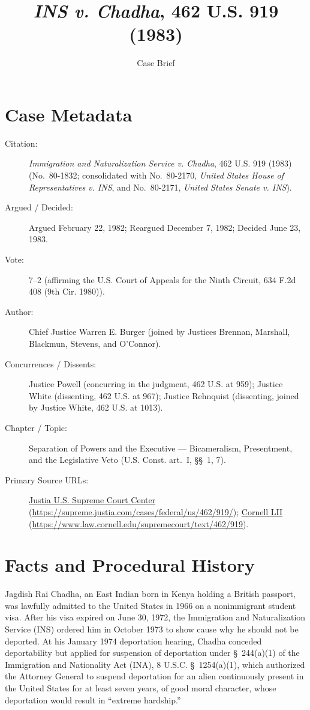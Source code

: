 \documentclass[12pt]{article}
\title{\textit{INS v. Chadha}, 462 U.S. 919 (1983)}
\author{Case Brief}
\date{}
\begin{document}
\maketitle

\section{Case Metadata}
\begin{description}
  \item[Citation:] \textit{Immigration and Naturalization Service v. Chadha}, 462 U.S. 919 (1983) (No.~80-1832; consolidated with No.~80-2170, \textit{United States House of Representatives v. INS}, and No.~80-2171, \textit{United States Senate v. INS}).
  \item[Argued / Decided:] Argued February 22, 1982; Reargued December 7, 1982; Decided June 23, 1983.
  \item[Vote:] 7--2 (affirming the U.S. Court of Appeals for the Ninth Circuit, 634 F.2d 408 (9th Cir. 1980)).
  \item[Author:] Chief Justice Warren E. Burger (joined by Justices Brennan, Marshall, Blackmun, Stevens, and O'Connor).
  \item[Concurrences / Dissents:] Justice Powell (concurring in the judgment, 462 U.S. at 959); Justice White (dissenting, 462 U.S. at 967); Justice Rehnquist (dissenting, joined by Justice White, 462 U.S. at 1013).
  \item[Chapter / Topic:] Separation of Powers and the Executive --- Bicameralism, Presentment, and the Legislative Veto (U.S. Const. art.~I, \S\S~1, 7).
  \item[Primary Source URLs:] \href{https://supreme.justia.com/cases/federal/us/462/919/}{Justia U.S. Supreme Court Center} (\url{https://supreme.justia.com/cases/federal/us/462/919/}); \href{https://www.law.cornell.edu/supremecourt/text/462/919}{Cornell LII} (\url{https://www.law.cornell.edu/supremecourt/text/462/919}).
\end{description}

\section{Facts and Procedural History}
Jagdish Rai Chadha, an East Indian born in Kenya holding a British passport, was lawfully admitted to the United States in 1966 on a nonimmigrant student visa. After his visa expired on June 30, 1972, the Immigration and Naturalization Service (INS) ordered him in October 1973 to show cause why he should not be deported. At his January 1974 deportation hearing, Chadha conceded deportability but applied for suspension of deportation under \S~244(a)(1) of the Immigration and Nationality Act (INA), 8 U.S.C. \S~1254(a)(1), which authorized the Attorney General to suspend deportation for an alien continuously present in the United States for at least seven years, of good moral character, whose deportation would result in ``extreme hardship.''
\end{document}
